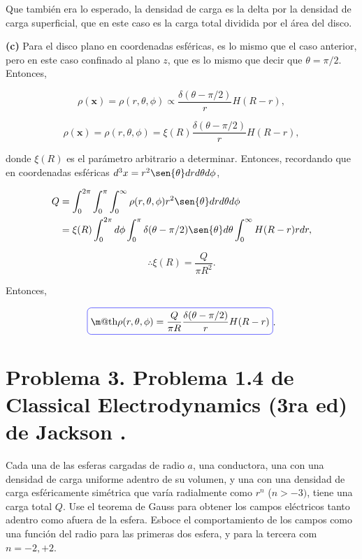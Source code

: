 \documentclass[a4paper,11pt]{article}
\makeatletter
\numberwithin{equation}{section}
\newcommand*{\boxcolor}{blue}
\renewcommand{\boxed}[1]{\textcolor{\boxcolor}{%
\tikz[baseline={([yshift=-1ex]current bounding box.center)}] \node [rectangle, minimum width=1ex,rounded corners,draw] {\normalcolor\m@th$\displaystyle#1$};}}
\makeatother
\begin{document}
Que también era lo esperado, la densidad de carga es la delta por la densidad de 
carga superficial, que en este caso es la carga total dividida por el área del 
disco.

\vspace{.3cm}

\textbf{(c)} Para el disco plano en coordenadas esféricas, es lo mismo que el caso 
anterior, pero en este caso confinado al plano $z$, que es lo mismo que decir que 
$\theta = \pi/2$. Entonces, 

\begin{equation}
 \rho(\mathbf{x}) =  \rho(r,\theta,\phi) \propto 
 \frac{\delta(\theta - \pi/2)}{r}H(R-r),
\end{equation}

\begin{equation}
 \rho(\mathbf{x}) =  \rho(r,\theta,\phi)  = 
 \xi(R)\frac{\delta(\theta - \pi/2)}{r}H(R-r),
\end{equation}

donde $\xi(R)$ es el parámetro arbitrario a determinar. Entonces, recordando que 
en coordenadas esféricas $d^3x = r^2\sen{\theta}dr d\theta d\phi$,

\begin{align*}
 Q &= \int_0^{2\pi} \int_0^\pi \int_0^\infty 
  \rho(r,\theta,\phi) r^2\sen{\theta}dr d\theta d\phi \\
  &=   \xi(R)\int_0^{2\pi}d\phi \int_0^\pi \delta(\theta - \pi/2)\sen{\theta}d\theta 
  \int_0^\infty H(R-r)rdr,
\end{align*}

\begin{equation}
 \therefore \xi(R) = \frac{Q}{\pi R^2}.
\end{equation}

Entonces,

\begin{equation}
 \boxed{\rho(r,\theta,\phi) = \frac{Q}{\pi R}\frac{\delta(\theta - \pi/2)}{r}H(R-r)}.
\end{equation}

\newpage

\section{Problema 3. Problema 1.4 de Classical Electrodynamics (3ra ed) de 
Jackson \cite{jackson}.}

Cada una de las esferas cargadas de radio $a$, una conductora, una con una densidad 
de carga uniforme adentro de su volumen, y una con una densidad de carga esféricamente 
simétrica que varía radialmente como $r^n$ ($n > -3)$, tiene una carga total $Q$. 
Use el teorema de Gauss para obtener los campos eléctricos tanto adentro como afuera 
de la esfera. Esboce el comportamiento de los campos como una función del radio 
para las primeras dos esfera, y para la tercera com $n= -2,+2$. 
\end{document}
